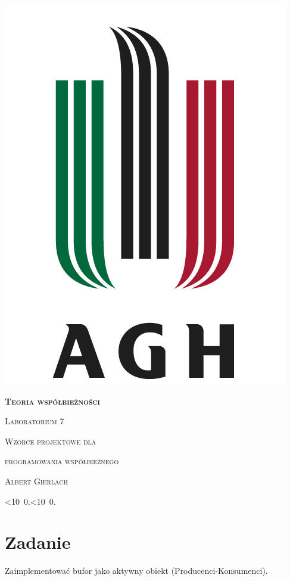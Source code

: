 \documentclass[12pt]{article}
\def\mydate{\leavevmode\hbox{\twodigits\day.\twodigits\month.\the\year}}
\def\twodigits#1{\ifnum#1<10 0\fi\the#1}
\begin{document}
\thispagestyle{empty}
\begin{center}
\begin{minipage}{0.75\linewidth}
    \centering
    \includegraphics[width=0.45\linewidth]{agh_logo2.png}
    \par
    \vspace{2cm}
    {\bfseries{\scshape{\Huge  Teoria współbieżności}}}
    \par
    \vspace{1.7cm}
    {\scshape{\Large Laboratorium 7}}
    \par
    \vspace{0.8cm}
    {\scshape{\Large Wzorce projektowe dla}}
    \vspace{0.3cm}
    \par
    {\scshape{\Large programowania współbieżnego}}
    \par
    \vspace{3cm}

    {\scshape{\Large Albert Gierlach}}\par
    \vspace{1cm}

    {\Large \mydate}
\end{minipage}
\end{center}
\clearpage



\section{Zadanie}
Zaimplementować bufor jako aktywny obiekt (Producenci-Konsumenci).

  
\end{document}
